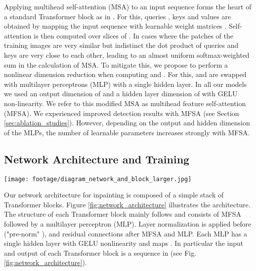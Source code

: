 \documentclass[runningheads]{llncs}
\begin{document}
Applying multihead self-attention (MSA) to an input sequence forms the heart of a standard Transformer block as in \cite{NIPS2017_3f5ee243}. For this, queries , keys  and values  are obtained by mapping the input sequence with learnable weight matrices . Self-attention is then computed over slices of . In cases where the patches of the training images are very similar but indistinct the dot product of queries and keys are very close to each other, leading to an almost uniform softmax-weighted sum in the calculation of MSA. To mitigate this, we propose to perform a nonlinear dimension reduction when computing  and . For this,  and  are swapped with multilayer perceptrons (MLP) with a single hidden layer. In all our models we used an output dimension of  and a hidden layer dimension of  with GELU non-linearity. We refer to this modified MSA as multihead feature self-attention (MFSA). We experienced improved detection results with MFSA (see Section \ref{sec:ablation_studies}). However, depending on the output and hidden dimension of the MLPs, the number of learnable parameters increases strongly with MFSA.

\subsection{Network Architecture and Training}

\begin{figure*}[t]
	\centering
	\texttt{[image: footage/diagram\_network\_and\_block\_larger.jpg]}
	\caption{Overview of the proposed architecture. Left: Parts of an individual Transformer block. Right: A stack of Transformer blocks builds the full architecture. Long residual connections are used to add information from earlier blocks to later ones.}
	\label{fig:network_architecture}
\end{figure*}

Our network architecture for inpainting is composed of a simple stack of  Transformer blocks. Figure \ref{fig:network_architecture} illustrates the architecture. The structure of each Transformer block mainly follows \cite{dosovitskiy2020} and consists of MFSA followed by a multilayer perceptron (MLP). Layer normalization is applied before ("pre-norm" \cite{Wang2019LearningDT}), and residual connections after MFSA and MLP. Each MLP has a single hidden layer with GELU nonlinearity and maps . In particular the input and output of each Transformer block is a sequence in  (see Fig. \ref{fig:network_architecture}).
\end{document}
